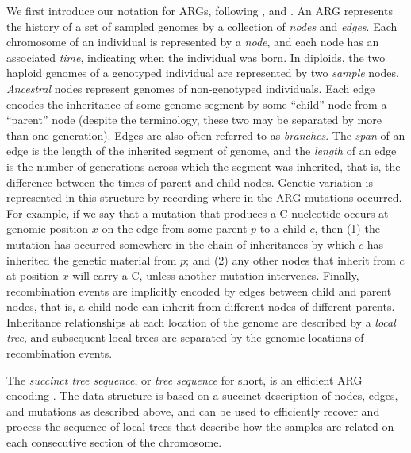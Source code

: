 We first introduce our notation for ARGs, following
\citet{kelleher2016efficient, kelleher2018efficient}, and \citet{wong2023general}.
%
An ARG represents the history of a set of sampled genomes
by a collection of \emph{nodes} and \emph{edges}.
%
Each chromosome of an individual is represented by a \emph{node},
and each node has an associated \emph{time},
indicating when the individual was born.
%
In diploids, the two haploid genomes of a genotyped individual are represented
by two \emph{sample} nodes.
%
\emph{Ancestral} nodes represent genomes of non-genotyped individuals.
%
Each edge encodes the inheritance of some genome segment
by some ``child'' node from a ``parent'' node
(despite the terminology, these two may be separated by more than one generation).
%
Edges are also often referred to as \emph{branches}.
%
The \emph{span} of an edge is the length of the inherited segment of genome,
and the \emph{length} of an edge is the number of generations across which
the segment was inherited, that is, the difference between the times of parent and child nodes.
%
Genetic variation is represented in this structure
by recording where in the ARG mutations occurred.
%
For example, if we say that a mutation that produces a C nucleotide
occurs at genomic position $x$ on the edge from some parent $p$
to a child $c$, then
(1) the mutation has occurred somewhere in the chain of inheritances
by which $c$ has inherited the genetic material from $p$; and
(2) any other nodes that inherit from $c$ at position $x$ will carry a C,
unless another mutation intervenes.
%
Finally, recombination events are implicitly encoded
by edges between child and parent nodes, that is,
a child node can inherit from different nodes of different parents.
%
Inheritance relationships at each location of the genome
are described by a \emph{local tree},
and subsequent local trees are separated by the genomic locations
of recombination events.

The \textit{succinct tree sequence}, or \textit{tree sequence} for short,
is an efficient ARG encoding \citep{kelleher2016efficient, kelleher2018efficient, wong2023general}.
%
The data structure is based on a succinct description of nodes, edges,
and mutations as described above,
and can be used to efficiently recover and process
the sequence of local trees that describe how the samples are related
on each consecutive section of the chromosome.
%


